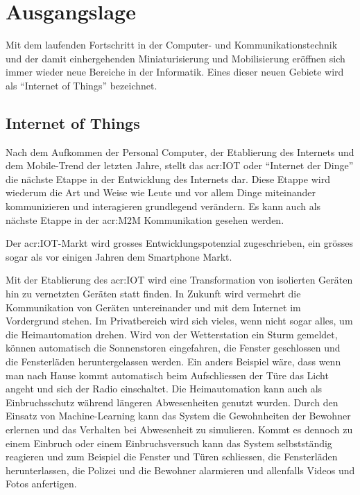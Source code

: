 \chapter{Ausgangslage}

Mit dem laufenden Fortschritt in der Computer- und Kommunikationstechnik und der damit einhergehenden Miniaturisierung und Mobilisierung eröffnen sich immer wieder neue Bereiche in der Informatik. Eines dieser neuen Gebiete wird als "`Internet of Things"' bezeichnet.


\section{Internet of Things}
Nach dem Aufkommen der Personal Computer, der Etablierung des Internets und dem Mobile-Trend der letzten Jahre, stellt das \gls{acr:IOT} oder "`Internet der Dinge"' die nächste Etappe in der Entwicklung des Internets dar. Diese Etappe wird wiederum die Art und Weise wie Leute und vor allem Dinge miteinander kommunizieren und interagieren grundlegend verändern. Es kann auch als nächste Etappe in der \gls{acr:M2M} Kommunikation gesehen werden.

Der \gls{acr:IOT}-Markt wird grosses Entwicklungspotenzial zugeschrieben, ein grösses sogar als vor einigen Jahren dem Smartphone Markt. 

Mit der Etablierung des \gls{acr:IOT} wird eine Transformation von isolierten Geräten hin zu vernetzten Geräten statt finden. In Zukunft wird vermehrt die Kommunikation von Geräten untereinander und mit dem Internet im Vordergrund stehen. Im Privatbereich wird sich vieles, wenn nicht sogar alles, um die Heimautomation drehen. Wird von der Wetterstation ein Sturm gemeldet, können automatisch die Sonnenstoren eingefahren, die Fenster geschlossen und die Fensterläden heruntergelassen werden. Ein anders Beispiel wäre, dass wenn man nach Hause kommt automatisch beim Aufschliessen der Türe das Licht angeht und sich der Radio einschaltet. Die Heimautomation kann auch als Einbruchsschutz während längeren Abwesenheiten genutzt wurden. Durch den Einsatz von Machine-Learning kann das System die Gewohnheiten der Bewohner erlernen und das Verhalten bei Abwesenheit zu simulieren. Kommt es dennoch zu einem Einbruch oder einem Einbruchsversuch kann das System selbstständig reagieren und zum Beispiel die Fenster und Türen schliessen, die Fensterläden herunterlassen, die Polizei und die Bewohner alarmieren und allenfalls Videos und Fotos anfertigen.


